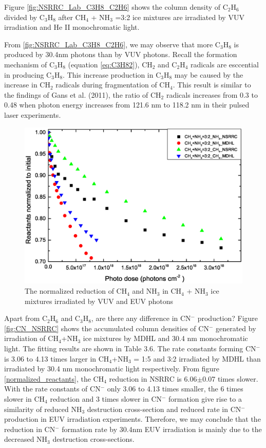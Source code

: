 Figure \ref{fig:NSRRC_Lab_C3H8_C2H6} shows the column density of C$_2$H$_6$ divided by C$_3$H$_8$ after CH$_4$ + NH$_3$ =3:2 ice mixtures are irradiated by VUV irradiation and He II monochromatic light.

From \ref{fig:NSRRC_Lab_C3H8_C2H6}, we may observe that more C$_3$H$_8$ is produced by 30.4nm photons than by VUV photons. Recall the formation mechanism of C$_3$H$_8$ (equation \ref{eq:C3H82}), CH$_2$ and C$_2$H$_4$ radicals are esccential in producing C$_3$H$_8$. This increase production in C$_3$H$_8$ may be caused by the increase in CH$_2$ radicals during fragmentation of CH$_4$. This result is similar to the findings of Gans et al. (2011), the ratio of CH$_2$ radicals increases from 0.3 to 0.48 when photon energy increases from 121.6 nm to 118.2 nm in their pulsed laser experiments.


\begin{figure}
\centering
\includegraphics[width=\textwidth]{figures/chapter3/Reactants_normalized_to_initial.eps}
\caption{The normalized reduction of CH$_4$ and NH$_3$ in CH$_4$ + NH$_3$ ice mixtures irradiated by VUV and EUV photons}
\label{fig:normalized_reactants}
\end{figure}


Apart from C$_2$H$_6$ and C$_3$H$_8$, are there any difference in CN$^-$ production? Figure \ref{fig:CN_NSRRC} shows the accumulated column densities of CN$^-$ generated by irradiation of CH$_4$+NH$_3$ ice mixtures by MDHL and 30.4 nm monochromatic light. The fitting results are shown in Table 3.6. The rate constants forming CN$^-$ is 3.06 to 4.13 times larger in CH$_4$+NH$_3$ = 1:5 and 3:2 irradiated by MDHL than irradiated by 30.4 nm monochromatic light respectively. From figure \ref{normalized_reactants}, the CH$_4$ reduction in NSRRC is 6.06$\pm$0.07 times slower. With the rate constants of CN$^-$ only 3.06 to 4.13 times smaller, the 6 times slower in CH$_4$ reduction and 3 times slower in CN$^-$ formation give rise to a similarity of reduced NH$_3$ destruction cross-section and reduced rate in CN$^-$ production in EUV irradiation experiments. Therefore, we may conclude that the reduction in CN$^-$ formation rate by 30.4nm EUV irradiation is mainly due to the decreased NH$_3$ destruction cross-sections.

